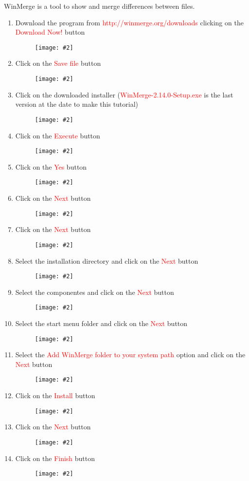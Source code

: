 \documentclass[a4paper]{article}
\newcommand{\FIG}[2]
{
	\begin{figure}[ht!]
	\centering
	\texttt{[image: \#2]}
	\end{figure}
}
\newcommand{\FIGUREB}[1]{\FIG{0.26}{#1}}
\newcommand{\RED}[1] {\textcolor{red}{#1}}
\begin{document}
WinMerge is a tool to show and merge differences between files.

\begin{enumerate}

\item Download the program from \RED{http://winmerge.org/downloads} clicking on
the \RED{Download Now!} button
\FIGUREB{Winmerge-1.png}

\clearpage

\item Click on the \RED{Save file} button
\FIGUREB{Winmerge-2.png}

\item Click on the downloaded installer (\RED{WinMerge-2.14.0-Setup.exe} is the
last version at the date to make this tutorial)
\FIGUREB{Winmerge-3.png}

\clearpage

\item Click on the \RED{Execute} button
\FIGUREB{Winmerge-4.png}

\item Click on the \RED{Yes} button
\FIGUREB{Winmerge-5.png}

\clearpage

\item Click on the \RED{Next} button
\FIGUREB{Winmerge-6.png}

\item Click on the \RED{Next} button
\FIGUREB{Winmerge-7.png}

\clearpage

\item Select the installation directory and click on the \RED{Next} button
\FIGUREB{Winmerge-8.png}

\item Select the componentes and click on the \RED{Next} button
\FIGUREB{Winmerge-9.png}

\clearpage

\item Select the start menu folder and click on the \RED{Next} button
\FIGUREB{Winmerge-10.png}

\item Select the \RED{Add WinMerge folder to your system path} option and click
on the \RED{Next} button
\FIGUREB{Winmerge-11.png}

\clearpage

\item Click on the \RED{Install} button
\FIGUREB{Winmerge-12.png}

\item Click on the \RED{Next} button
\FIGUREB{Winmerge-13.png}

\clearpage

\item Click on the \RED{Finish} button
\FIGUREB{Winmerge-14.png}

\end{enumerate}
\end{document}
